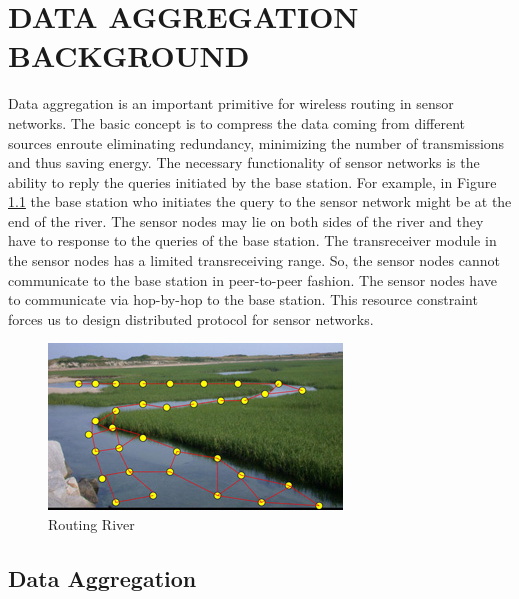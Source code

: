\chapter{DATA AGGREGATION BACKGROUND} %
\label{cha:Data Aggregation Background}

	Data aggregation is an important primitive for wireless routing in sensor networks. 
	The basic concept is to compress the data coming from different sources enroute eliminating redundancy, minimizing the number of transmissions and thus saving energy\cite{krishnamachari2002impact}.
	The necessary functionality of sensor networks is the ability to reply the queries initiated by the base station. 
	For example, in Figure \ref{fig:Routing River} \cite{RoutingRiver} the base station who initiates the query to the sensor network might be at the end of the river.
	The sensor nodes may lie on both sides of the river and they have to response to the queries of the base station.
	The transreceiver module in the sensor nodes has a limited transreceiving range. 
	So, the sensor nodes cannot communicate to the base station in peer-to-peer fashion.
	The sensor nodes have to communicate via hop-by-hop to the base station.
	This resource constraint forces us to design distributed protocol for sensor networks.  
	\begin{figure}[h!]
		\centering
		\includegraphics[scale = 2]{images/routing-river.jpg}
		\caption{Routing River}
		\label{fig:Routing River}
	\end{figure}

\section{Data Aggregation}

